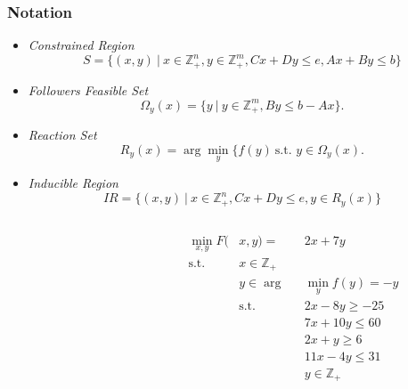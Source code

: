 \documentclass[11pt]{beamer}
\begin{document}
\begin{frame}
	\frametitle{Notation}
	\begin{itemize}
		\item \textit{Constrained Region}
		\begin{equation*}
		S = \{(x,y) \ | \ x \in \mathbb{Z}^n_+, y \in \mathbb{Z}^m_+, Cx+Dy \le e, Ax + By \le b \}
		\end{equation*}
		\item \textit{Followers Feasible Set}
		\begin{equation*}
			\Omega_y(x) = \{y \ | \ y \in \mathbb{Z}^m_+, By \le b - Ax \}.
		\end{equation*}
		\item \textit{Reaction Set}
		\begin{equation*}
			R_y(x) = \arg \min_y \{f(y) \ \text{s.t. } y \in \Omega_y(x).
		\end{equation*}
		\item \textit{Inducible Region}
		\begin{equation*}
			IR = \{(x,y) \ | \ x \in \mathbb{Z}^n_+, Cx+Dy \le e, y \in R_y(x)\}
		\end{equation*}
	\end{itemize}
\end{frame}

\begin{frame}
	\begin{columns}[T] %
		\begin{column}{.48\textwidth}
			
		\end{column}%
		\hfill%
		\begin{column}{.48\textwidth}
			\begin{alignat*}{2}
				\min_{x,y} F(&x,y) =&& 2x + 7y \\
				\text{s.t.}\quad &x \in \mathbb{Z}_+&& \\
				&y \in \arg&& \min_y f(y) = -y \\
				&\text{s.t.}\quad &&2x - 8y \ge -25 \\
				& &&7x + 10y \le 60 \\
				& &&2x + y \ge 6 \\
				& &&11x - 4y \le 31 \\
				& &&y \in \mathbb{Z}_+ 
			\end{alignat*}
		\end{column}%
	\end{columns}
	
\end{frame}
\end{document}
